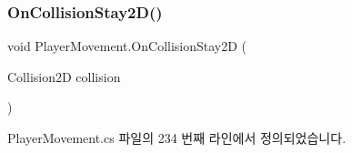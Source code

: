 \mbox{\label{class_player_movement_a66307ea038b50ef0f1ea1276507cc66c}} 
\subsubsection{\texorpdfstring{OnCollisionStay2D()}{OnCollisionStay2D()}}
{\footnotesize\ttfamily void Player\+Movement.\+On\+Collision\+Stay2D (\begin{DoxyParamCaption}\item[{Collision2D}]{collision }\end{DoxyParamCaption})\hspace{0.3cm}{\ttfamily [private]}}



Player\+Movement.\+cs 파일의 234 번째 라인에서 정의되었습니다.



